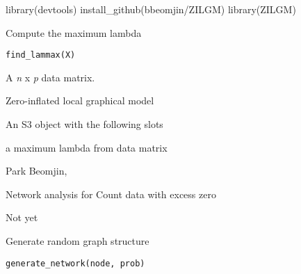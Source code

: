 \documentclass[a4paper]{book}
\begin{document}
%
\begin{Examples}
\begin{ExampleCode}
library(devtools)
install_github(bbeomjin/ZILGM)
library(ZILGM)
\end{ExampleCode}
\end{Examples}
%
\begin{Description}\relax
Compute the maximum lambda
\end{Description}
%
\begin{Usage}
\begin{verbatim}
find_lammax(X)
\end{verbatim}
\end{Usage}
%
\begin{Arguments}
\begin{ldescription}
\item[\code{X}] 
A \emph{n} x \emph{p} data matrix.

\end{ldescription}
\end{Arguments}
%
\begin{Details}\relax
Zero-inflated local graphical model
\end{Details}
%
\begin{Value}
An S3 object with the following slots
\begin{ldescription}
\item[\code{lammax}] a maximum lambda from data matrix
\end{ldescription}
\end{Value}
%
\begin{Author}\relax
Park Beomjin, 
\end{Author}
%
\begin{References}\relax
Network analysis for Count data with excess zero
\end{References}
%
\begin{Examples}
\begin{ExampleCode}
Not yet
\end{ExampleCode}
\end{Examples}
%
\begin{Description}\relax
Generate random graph structure
\end{Description}
%
\begin{Usage}
\begin{verbatim}
generate_network(node, prob)
\end{verbatim}
\end{Usage}
\end{document}

